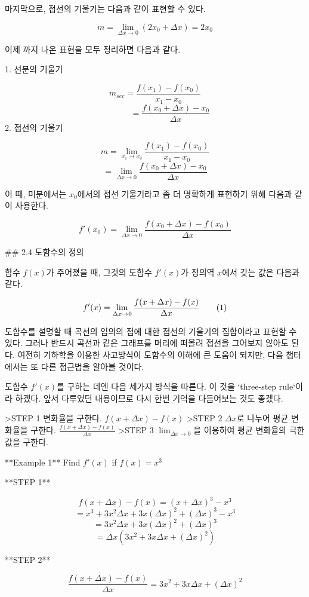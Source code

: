 마지막으로, 접선의 기울기는 다음과 같이 표현할 수 있다.

$$
m = \lim_{\Delta x \to 0}(2 x_0 + \Delta x) = 2x_0
$$


이제 까지 나온 표현을 모두 정리하면 다음과 같다. 

1. 선분의 기울기 


$$ m_{sec} = \frac{f(x_1) - f(x_0)}{x_1 - x_0 }$$
$$\;\;\;\;\;\;\;\;\;\;\;\;\;= \frac{f(x_0 + \Delta x) - x_0 }{\Delta x}$$
2. 접선의 기울기

$$ m = \lim_{x_1 \to x_0}\frac{f(x_1) - f(x_0)}{x_1 - x_0 } $$
$$ = \lim_{\Delta x \to 0} \frac{f(x_0 + \Delta x) - x_0 }{\Delta x}
$$

이 때, 미분에서는 $x_0$에서의 접선 기울기라고 좀 더 명확하게 표현하기 위해 다음과 같이 사용한다. 

$$
f'(x_0) = \lim_{\Delta x \to 0} \frac{f(x_0 + \Delta x) - f(x_0) }{\Delta x}
$$

## 2.4  도함수의 정의  

함수 $f(x)$가 주어졌을 때, 그것의 도함수 $f'(x)$가 정의역 $x$에서 갖는 값은 다음과 같다.    

$$
f'(x) = \lim_{\Delta x \to 0} \frac{f(x + \Delta x) - f(x) }{\Delta x}\tag1
$$

도함수를 설명할 때 곡선의 임의의 점에 대한 접선의 기울기의 집합이라고 표현할 수 있다. 그러나 반드시 곡선과 같은 그래프를 머리에 떠올려 접선을 그어보지 않아도 된다.  
여전히 기하학을 이용한 사고방식이 도함수의 이해에 큰 도움이 되지만, 다음 챕터에서는 또 다른 접근법을 알아볼 것이다.

도함수 $f'(x)$를 구하는 데엔 다음 세가지 방식을 따른다. 이 것을 `three-step rule`이라 하겠다. 앞서 다루었던 내용이므로 다시 한번 기억을 다듬어보는 것도 좋겠다.  

>STEP 1 변화율을 구한다. $f(x+\Delta x) - f(x)$   
>STEP 2 $\Delta x$로 나누어 평균 변화율을 구한다. $\frac{f(x+\Delta x)-f(x)}{\Delta x}$  
>STEP 3 $\lim_{\Delta x \to 0}$을 이용하여 평균 변화율의 극한값을 구한다.  

**Example 1** Find $f'(x)$ if $f(x) = x^3$  

**STEP 1**

$$
 f(x + \Delta x) - f(x) = (x+ \Delta x)^3 - x^3 
 $$
 $$
 = x^3 + 3x^2\Delta x + 3x(\Delta x)^2 + (\Delta x)^3 - x^3
 $$
 $$
 = 3x^2\Delta x + 3x(\Delta x)^2 + (\Delta x)^3
 $$
 $$
 = \Delta x(3x^2 + 3x\Delta x + (\Delta x)^2)
 $$

**STEP 2**

$$
\frac{f(x+\Delta x)- f(x)}{\Delta x} = 3x^2 + 3x\Delta x + (\Delta x)^2
$$

